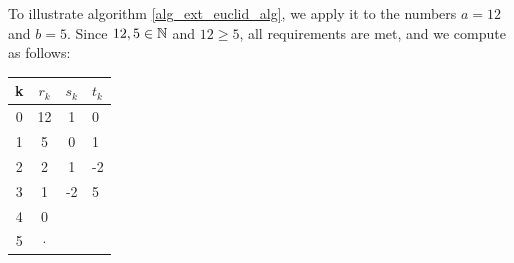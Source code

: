 \begin{example}
\label{example:extended_Euclidean_division_1}
To illustrate algorithm \ref{alg_ext_euclid_alg}, we apply it to the numbers $a=12$ and $b=5$. Since $12,5\in \mathbb{N}$ and $12\geq 5$, all requirements are met, and we compute as follows:
\begin{center}
  \begin{tabular}{c | c c l}
    k & $ r_k $ & $ s_k $ & $ t_k $ \\\hline
    0 & 12 & 1 & 0 \\
    1 & 5 & 0 & 1 \\
    2 & 2 & 1 & -2 \\
    3 & 1 & -2 & 5 \\
    4 & 0 &  &  \\
    5 & $\cdot$ & &\\
  \end{tabular}
  \end{center}

  

\end{example}
